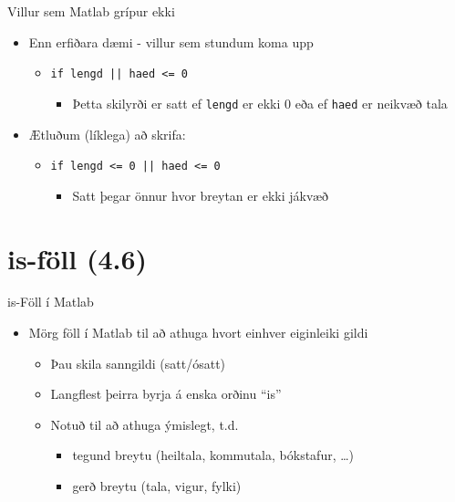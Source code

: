 \documentclass{beamer}
\begin{document}
\begin{frame}{Villur sem Matlab grípur ekki}
\begin{itemize}
 \item Enn erfiðara dæmi - villur sem stundum koma upp
 \begin{itemize}
  \item \texttt{if lengd || haed <= 0}
  \begin{itemize}
   \item Þetta skilyrði er satt ef \texttt{lengd} er ekki 0 eða ef \texttt{haed} er neikvæð tala
  \end{itemize}
 \end{itemize}
 \item Ætluðum (líklega) að skrifa:
 \begin{itemize}
 \item \texttt{if lengd <= 0 || haed <= 0}
  \begin{itemize}
   \item Satt þegar önnur hvor breytan er ekki jákvæð
  \end{itemize}
 \end{itemize}
\end{itemize}
\end{frame}


\section{is-föll (4.6)}

\begin{frame}{is-Föll í Matlab}
\begin{itemize}
 \item Mörg föll í Matlab til að athuga hvort einhver eiginleiki gildi
 \begin{itemize}
  \item Þau skila sanngildi (satt/ósatt)
  \item Langflest þeirra byrja á enska orðinu ``is''
  \item Notuð til að athuga ýmislegt, t.d.
  \begin{itemize}
   \item tegund breytu (heiltala, kommutala, bókstafur, \ldots)
   \item gerð breytu (tala, vigur, fylki)
  \end{itemize}
 \end{itemize}
\end{itemize}
\end{frame}
\end{document}
